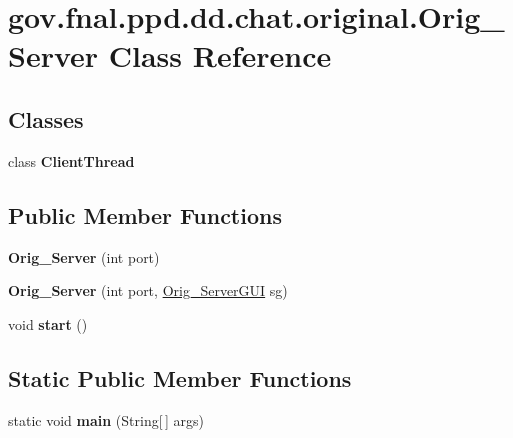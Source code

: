 \hypertarget{classgov_1_1fnal_1_1ppd_1_1dd_1_1chat_1_1original_1_1Orig__Server}{\section{gov.\-fnal.\-ppd.\-dd.\-chat.\-original.\-Orig\-\_\-\-Server Class Reference}
\label{classgov_1_1fnal_1_1ppd_1_1dd_1_1chat_1_1original_1_1Orig__Server}
}
\subsection*{Classes}
\begin{DoxyCompactItemize}
\item 
class {\bfseries Client\-Thread}
\end{DoxyCompactItemize}
\subsection*{Public Member Functions}
\begin{DoxyCompactItemize}
\item 
\hypertarget{classgov_1_1fnal_1_1ppd_1_1dd_1_1chat_1_1original_1_1Orig__Server_ae320c0c47b2ba799916e41859aaa892a}{{\bfseries Orig\-\_\-\-Server} (int port)}\label{classgov_1_1fnal_1_1ppd_1_1dd_1_1chat_1_1original_1_1Orig__Server_ae320c0c47b2ba799916e41859aaa892a}

\item 
\hypertarget{classgov_1_1fnal_1_1ppd_1_1dd_1_1chat_1_1original_1_1Orig__Server_a53137e0780af9328fd9988f1b6214c7c}{{\bfseries Orig\-\_\-\-Server} (int port, \hyperlink{classgov_1_1fnal_1_1ppd_1_1dd_1_1chat_1_1original_1_1Orig__ServerGUI}{Orig\-\_\-\-Server\-G\-U\-I} sg)}\label{classgov_1_1fnal_1_1ppd_1_1dd_1_1chat_1_1original_1_1Orig__Server_a53137e0780af9328fd9988f1b6214c7c}

\item 
\hypertarget{classgov_1_1fnal_1_1ppd_1_1dd_1_1chat_1_1original_1_1Orig__Server_a4a73c0f746ec02f0cee7e19bddf15606}{void {\bfseries start} ()}\label{classgov_1_1fnal_1_1ppd_1_1dd_1_1chat_1_1original_1_1Orig__Server_a4a73c0f746ec02f0cee7e19bddf15606}

\end{DoxyCompactItemize}
\subsection*{Static Public Member Functions}
\begin{DoxyCompactItemize}
\item 
\hypertarget{classgov_1_1fnal_1_1ppd_1_1dd_1_1chat_1_1original_1_1Orig__Server_a9f931fc88c775c6337f90361c7f3b12a}{static void {\bfseries main} (String\mbox{[}$\,$\mbox{]} args)}\label{classgov_1_1fnal_1_1ppd_1_1dd_1_1chat_1_1original_1_1Orig__Server_a9f931fc88c775c6337f90361c7f3b12a}

\end{DoxyCompactItemize}
